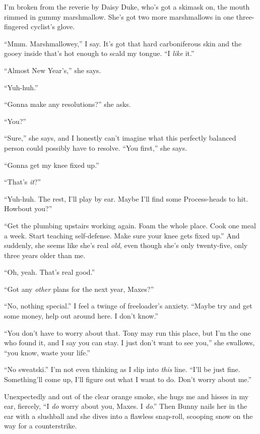 I'm broken from the reverie by Daisy Duke, who's got a skimask on,
the mouth rimmed in gummy marshmallow. She's got two more
marshmallows in one three-fingered cyclist's glove.

``Mmm. Marshmallowey,'' I say. It's got that hard carboniferous
skin and the gooey inside that's hot enough to scald my tongue.
``I \emph{like} it.''

``Almost New Year's,'' she says.

``Yuh-huh.''

``Gonna make any resolutions?'' she asks.

``You?''

``Sure,'' she says, and I honestly can't imagine what this
perfectly balanced person could possibly have to resolve.
``You first,'' she says.

``Gonna get my knee fixed up.''

``That's \emph{it}?''

``Yuh-huh. The rest, I'll play by ear. Maybe I'll find some Process-heads to 
hit. Howbout you?''

``Get the plumbing upstairs working again. Foam the whole place. Cook one meal 
a week. Start teaching self-defense. Make sure your knee gets fixed up.''
And suddenly, she seems like she's real \emph{old}, even though
she's only twenty-five, only three years older than me.

``Oh, yeah. That's real good.''

``Got any \emph{other} plans for the next year, Maxes?''

``No, nothing special.'' I feel a twinge of freeloader's anxiety.
``Maybe try and get some money, help out around here. I don't know.''

``You don't have to worry about that. Tony may run this place, but I'm the one 
who found it, and I say you can stay. I just don't want to see you,''
she swallows, ``you know, waste your life.''

``No sweatski.'' I'm not even thinking as I slip into \emph{this}
line.
``I'll be just fine. Something'll come up, I'll figure out what I want to do. 
Don't worry about me.''

Unexpectedly and out of the clear orange smoke, she hugs me and
hisses in my ear, fiercely,
``I \emph{do} worry about you, Maxes. I \emph{do}.'' Then Bunny
nails her in the ear with a slushball and she dives into a flawless
snap-roll, scooping snow on the way for a counterstrike.

\tb


